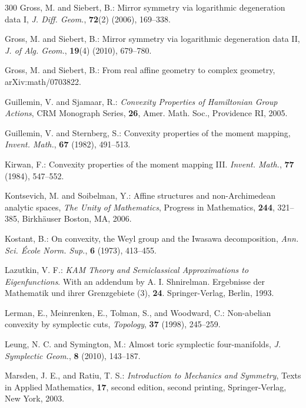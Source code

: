 \documentclass[11pt]{article}
\begin{document}
{\begin{thebibliography}{300}
   Gross, M. and Siebert, B.: Mirror symmetry via
    logarithmic degeneration data I, \textit{J. Diff. Geom.},
    \textbf{72}(2) (2006), 169--338.

   Gross, M. and Siebert, B.: Mirror symmetry via
    logarithmic degeneration data II, \textit{J. of Alg. Geom.},
    \textbf{19}(4) (2010), 679--780.

   Gross, M. and Siebert, B.: From real affine geometry
    to complex geometry, arXiv:math/0703822.

   Guillemin, V. and Sjamaar, R.: \textit{Convexity
      Properties of Hamiltonian Group Actions}, CRM Monograph Series,
    \textbf{26}, Amer. Math. Soc., Providence RI, 2005.

   Guillemin, V. and Sternberg, S.: Convexity
    properties of the moment mapping, \textit{Invent. Math.}, {\bf 67}
    (1982), 491--513.

   Kirwan, F.: Convexity properties of the moment
    mapping III.  \textit{Invent. Math.}, {\bf 77} (1984), 547--552.

   Kontsevich, M. and Soibelman, Y.: Affine structures and
    non-Archimedean analytic spaces, \textit{The Unity of
      Mathematics}, Progress in Mathematics, \textbf{244}, 321--385,
    Birkh{\"a}user Boston, MA, 2006.

   Kostant, B.: On convexity, the Weyl group and the
    Iwasawa decomposition, \textit{Ann. Sci. \'Ecole Norm.  Sup.},
    \textbf{6} (1973), 413--455.

   Lazutkin, V. F.: \textit{KAM Theory and
      Semiclassical Approximations to Eigenfunctions}. With an
    addendum by A. I. Shnirelman.  Ergebnisse der Mathematik und ihrer
    Grenzgebiete (3), \textbf{24}. Springer-Verlag, Berlin, 1993.

   Lerman, E., Meinrenken, E., Tolman, S., and
    Woodward, C.: Non-abelian convexity by symplectic cuts,
    \textit{Topology}, \textbf{37} (1998), 245--259.

   Leung, N. C. and Symington, M.: Almost toric symplectic
    four-manifolds, \textit{J. Symplectic Geom.}, \textbf{8} (2010),
    143--187.

   Marsden, J. E., and Ratiu, T. S.:
    \textit{Introduction to Mechanics and Symmetry}, Texts in Applied
    Mathematics, \textbf{17}, second edition, second printing,
    Springer-Verlag, New York, 2003.


\end{thebibliography}}
\end{document}
